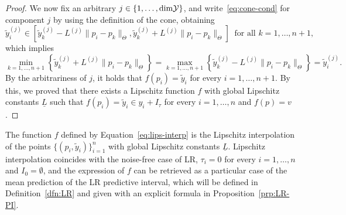 \begin{proof}
    We now fix an arbitrary $j \in \{1, \dots, \text{dim} \mathcal Y\}$, and write~\eqref{eq:cone-cond} for component $j$ by using the definition of the cone, obtaining
    \[
        \tilde y_i^{(j)} \in \left[ \tilde y_k^{(j)} - L^{(j)} \|p_i - p_k \|_\Theta, \tilde y_k^{(j)} + L^{(j)} \|p_i - p_k \|_\Theta \right] \ \text{ for all } k = 1, \dots, n+1,
    \] 
    which implies 
    \[
        \min_{k=1,\dots,n+1} \left\{ \tilde y_k^{(j)} + L^{(j)} \|p_i - p_k \|_\Theta \right\} =  \max_{k=1,\dots,n+1} \left\{ \tilde y_k^{(j)} - L^{(j)} \|p_i - p_k \|_\Theta \right\} = \tilde y_i^{(j)}.
    \]
    By the arbitrariness of $j$, it holds that $f(p_i) = \tilde y_i$ for every $i = 1, \dots, n+1$. \newline
    By this, we proved that there exists a Lipschitz function $f$ with global Lipschitz constants $\underline L$ such that $f(p_i) = \tilde y_i \in y_i + I_\tau$ for every $i = 1, \dots, n$ and $f(p) = v$.
\end{proof}
\begin{rmk}
    The function $f$ defined by Equation~\eqref{eq:lips-interp} is the Lipschitz interpolation of the points $\{(p_i, \tilde y_i)\}_{i=1}^n$ with global Lipschitz constants $\underline L$. 
    Lipschitz interpolation coincides with the noise-free case of LR, $\tau_i = 0$ for every $i = 1, \dots, n$ and $ I_0 = \emptyset$, and the expression of $f$ can be retrieved as a particular case of the mean prediction of the LR predictive interval, which will be defined in Definition~\ref{dfn:LR} and given with an explicit formula in Proposition~\ref{prp:LR-PI}.
\end{rmk}

